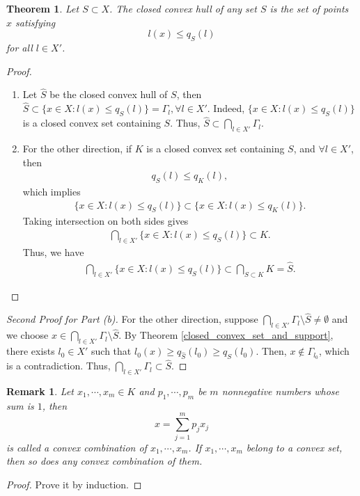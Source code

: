 \documentclass[10pt]{book}
\newtheorem{theorem}{Theorem}[chapter]
\newtheorem{remark}{Remark}[chapter]
\theoremstyle{definition}
\numberwithin{equation}{chapter}
\begin{document}
\begin{theorem}
Let $S \subset X$. The closed convex hull of any set $S$ is the set of points $x$ satisfying 
$$l(x) \leq q_S(l)$$ 
for all $l \in X'$.
\end{theorem}
\begin{proof}
~\begin{enumerate}[label=(\alph*)]
    \item Let $\hat{S}$ be the closed convex hull of $S$, then $\hat{S} \subset \{x \in X: l(x) \leq q_S(l)\} = \Gamma_l, \forall l \in X'$. Indeed, $\{x \in X: l(x) \leq q_S(l)\}$ is a closed convex set containing $S$. Thus, $\hat{S} \subset \bigcap_{l \in X'} \Gamma_l$.
    
    \item For the other direction, if $K$ is a closed convex set containing $S$, and $\forall l \in X'$, then 
    \begin{align*}
        q_S(l) \leq q_K(l),
    \end{align*}
    which implies
    \begin{align*}
        \{x \in X: l(x) \leq q_S(l)\} \subset \{x \in X: l(x) \leq q_K(l)\}.
    \end{align*}
    Taking intersection on both sides gives
    \begin{align*}
        \bigcap_{l \in X'} \{x \in X: l(x) \leq q_S(l)\} \subset K.
    \end{align*}
    Thus, we have
    \begin{align*}
        \bigcap_{l \in X'} \{x \in X: l(x) \leq q_S(l)\} \subset \bigcap_{S \subset K} K = \hat{S}.
    \end{align*}
\end{enumerate}
\end{proof}

\begin{proof}[Second Proof for Part (b)] \cite{26}
For the other direction, suppose $\bigcap_{l \in X'} \Gamma_l \setminus \hat{S} \neq \emptyset$ and we choose $x \in \bigcap_{l \in X'} \Gamma_l \setminus \hat{S}$. By Theorem \ref{closed_convex_set_and_support}, there exists $l_0 \in X'$ such that $l_0(x) \geq q_{\hat{S}}(l_0) \geq q_S(l_0)$. Then, $x \notin \Gamma_{l_0}$, which is a contradiction. Thus, $\bigcap_{l \in X'} \Gamma_l \subset \hat{S}$.
\end{proof}

\begin{remark}
Let $x_1, \cdots, x_m \in K$ and $p_1, \cdots, p_m$ be $m$ nonnegative numbers whose sum is $1$, then 
$$x = \sum^m_{j=1} p_j x_j$$ 
is called a convex combination of $x_1, \cdots, x_m$. If $x_1, \cdots, x_m$ belong to a convex set, then so does any convex combination of them.
\end{remark}
\begin{proof}
Prove it by induction.
\end{proof}
\end{document}
